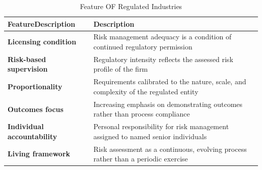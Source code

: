 \begin{table}[H]
  \centering
  \renewcommand{\arraystretch}{1.5}
  \begin{tabularx}{\textwidth}{ | >{\raggedright\arraybackslash}p{} 
                                | >{\raggedright\arraybackslash}X | }
    \hline
    \textbf{FeatureDescription} & \textbf{Description} \\
    \hline
    \textbf{Licensing condition} & Risk management adequacy is a condition of continued regulatory permission\\
    \hline
    \textbf{Risk-based supervision} & Regulatory intensity reflects the assessed risk profile of the firm\\
    \hline
    \textbf{Proportionality} & Requirements calibrated to the nature, scale, and complexity of the regulated entity\\
    \hline
    \textbf{Outcomes focus} & Increasing emphasis on demonstrating outcomes rather than process compliance\\
    \hline
    \textbf{Individual accountability} & Personal responsibility for risk management assigned to named senior individuals\\
    \hline
    \textbf{Living framework} & Risk assessment as a continuous, evolving process rather than a periodic exercise\\
    \hline
  \end{tabularx}
  \caption{Feature OF Regulated Industries}
\end{table}

